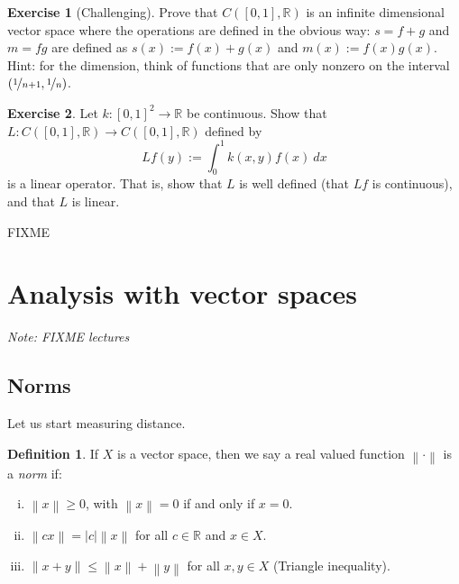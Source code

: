 \documentclass[12pt]{book}
\newcommand{\abs}[1]{\left\lvert {#1} \right\rvert}
\newcommand{\norm}[1]{\left\lVert {#1} \right\rVert}
\newcommand{\R}{{\mathbb{R}}}
\newcommand{\myindex}[1]{#1\index{#1}}
\newcommand{\sectionnotes}[1]{\noindent \emph{Note: #1} \medskip \par}
\newcommand{\sectionnewpage}{\clearpage}
\theoremstyle{plain}
\theoremstyle{remark}
\theoremstyle{definition}
\newtheorem{defn}[thm]{Definition}
\theoremstyle{exercise}
\newtheorem{exercise}{Exercise}[section]
\theoremstyle{example}
\begin{document}
\begin{exercise}[Challenging]
Prove that $C([0,1],\R)$ is an infinite dimensional vector space
where the operations are defined in the obvious way:
$s=f+g$ and $m=fg$ are defined as
$s(x) := f(x)+g(x)$ and
$m(x) := f(x)g(x)$.
Hint: for the dimension, think of functions that are only nonzero
on the interval $(\nicefrac{1}{n+1},\nicefrac{1}{n})$.
\end{exercise}

\begin{exercise}
Let $k \colon [0,1]^2 \to \R$ be continuous.  Show that
$L \colon C([0,1],\R) \to C([0,1],\R)$ defined by
\begin{equation*}
Lf(y) := \int_0^1 k(x,y)f(x)~dx
\end{equation*}
is a linear operator.  That is, show that $L$ is well defined (that
$Lf$ is continuous), and that $L$ is linear.
\end{exercise}


FIXME


\sectionnewpage
\section{Analysis with vector spaces}
\label{sec:normsmatsdets}

\sectionnotes{FIXME lectures}

\subsection{Norms}

Let us start measuring distance.

\begin{defn}
If $X$ is a vector space, then we say
a real valued function $\norm{\cdot}$ is a \emph{\myindex{norm}} if:
\begin{enumerate}[(i)]
\item $\norm{x} \geq 0$, with $\norm{x}=0$ if and only if $x=0$.
\item $\norm{cx} = \abs{c}\norm{x}$ for all $c \in \R$ and $x \in X$.
\item $\norm{x+y} \leq \norm{x}+\norm{y}$ for all $x,y \in X$
\qquad (Triangle inequality).
\end{enumerate}
\end{defn}
\end{document}
